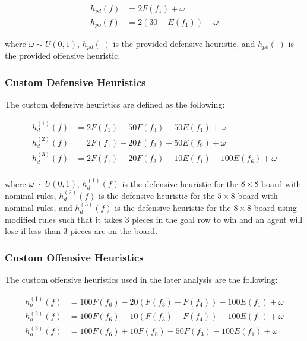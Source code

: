 \documentclass{article}[12pt]
\begin{document}
   \begin{align*}
   h_{pd}( f ) &= 2F(f_1) + \omega \\
   h_{po}( f ) &= 2\left( 30 - E(f_1) \right) + \omega
   \end{align*}
   
   where $\omega \sim U(0,1)$, $h_{pd}(\cdot)$ is the provided defensive heuristic, and $h_{po}(\cdot)$ is the provided offensive heuristic.
   
   \subsubsection{Custom Defensive Heuristics}
   The custom defensive heuristics are defined as the following:
   
   \begin{align*}
   h_{d}^{(1)}( f ) &= 2F(f_1) - 50 F(f_3) - 50 E(f_1)+ \omega \\
   h_{d}^{(2)}( f ) &= 2F(f_1) - 20 F(f_3) - 50 E(f_9)+ \omega \\
   h_{d}^{(3)}( f ) &= 2F(f_1) - 20 F(f_3) - 10 E(f_1) - 100 E(f_6) + \omega \\
   \end{align*}
   
   where $\omega \sim U(0,1)$, $h_{d}^{(1)}( f )$ is the defensive heuristic for the $8 \times 8$ board with nominal rules, $h_{d}^{(2)}( f )$ is the defensive heuristic for the $5 \times 8$ board with nominal rules, and $h_{d}^{(3)}( f )$ is the defensive heuristic for the $8 \times 8$ board using modified rules such that it takes 3 pieces in the goal row to win and an agent will lose if less than 3 pieces are on the board.
   
   \subsubsection{Custom Offensive Heuristics}
   The custom offensive heuristics used in the later analysis are the following:
   
   \begin{align*}
   h_{o}^{(1)}( f ) &= 100F(f_6) - 20 \left( F(f_3) + F(f_4) \right) - 100 E(f_1)+ \omega \\
   h_{o}^{(2)}( f ) &= 100F(f_6) - 10 \left( F(f_3) + F(f_4) \right) - 100 E(f_1)+ \omega \\
   h_{o}^{(3)}( f ) &= 100F(f_6) + 10F(f_8) - 50 F(f_3) - 100 E(f_1)+ \omega \\
   \end{align*}
   
\end{document}
